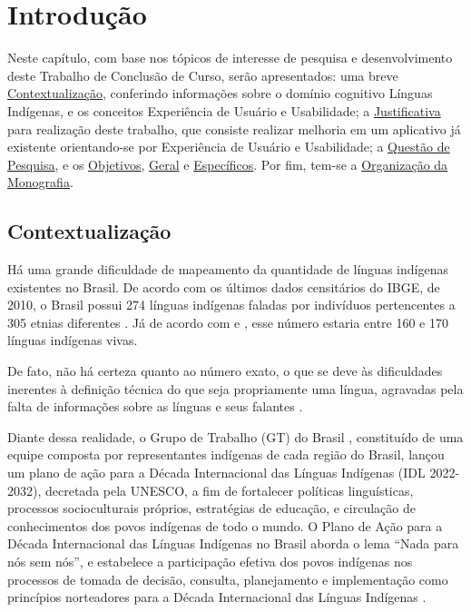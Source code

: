 \chapter[Introdução]{Introdução}

Neste capítulo, com base nos tópicos de interesse de pesquisa e desenvolvimento deste Trabalho de Conclusão de Curso, serão apresentados: uma breve
\hyperref[sec:Contextualização]{Contextualização}, conferindo informações sobre o domínio cognitivo Línguas Indígenas, e os conceitos Experiência de Usuário e
Usabilidade; a \hyperref[sec:Justificativa]{Justificativa} para realização deste trabalho, que consiste realizar melhoria em um aplicativo já existente orientando-se por
Experiência de Usuário e Usabilidade; a \hyperref[sec:QuestaodePesquisa]{Questão de Pesquisa}, e os \hyperref[sec:Objetivos]{Objetivos},
\hyperref[sec:ObjetivoGeral]{Geral} e \hyperref[sec:ObjetivosEspecificos]{Específicos}. Por fim, tem-se a \hyperref[sec:OrganizacaodaMonografia]{Organização da Monografia}.

\section{Contextualização}
\label{sec:Contextualização}

Há uma grande dificuldade de mapeamento da quantidade de línguas indígenas existentes no Brasil. De acordo com os últimos dados censitários do IBGE, de 2010, o Brasil
possui 274 línguas indígenas faladas por indivíduos pertencentes a 305 etnias diferentes \cite{ibge}. Já de acordo com  e , esse
número estaria entre 160 e 170 línguas indígenas vivas.

De fato, não há certeza quanto ao número exato, o que se deve às dificuldades inerentes à definição técnica do que seja propriamente uma língua, agravadas pela falta de
informações sobre as línguas e seus falantes \cite{seki2000}.

Diante dessa realidade, o Grupo de Trabalho (GT) do Brasil \cite{gtbrasil2021}, constituído de uma equipe composta por representantes indígenas de cada região do Brasil,
lançou um plano de ação para a Década Internacional das Línguas Indígenas (IDL 2022-2032), decretada pela UNESCO, a fim de fortalecer políticas linguísticas, processos
socioculturais próprios, estratégias de educação, e circulação de conhecimentos dos povos indígenas de todo o mundo. O Plano de Ação para a Década Internacional das
Línguas Indígenas no Brasil aborda o lema “Nada para nós sem nós”, e estabelece a participação efetiva dos povos indígenas nos processos de tomada de decisão, consulta,
planejamento e implementação como princípios norteadores para a Década Internacional das Línguas Indígenas \cite{gtbrasil2021}.

